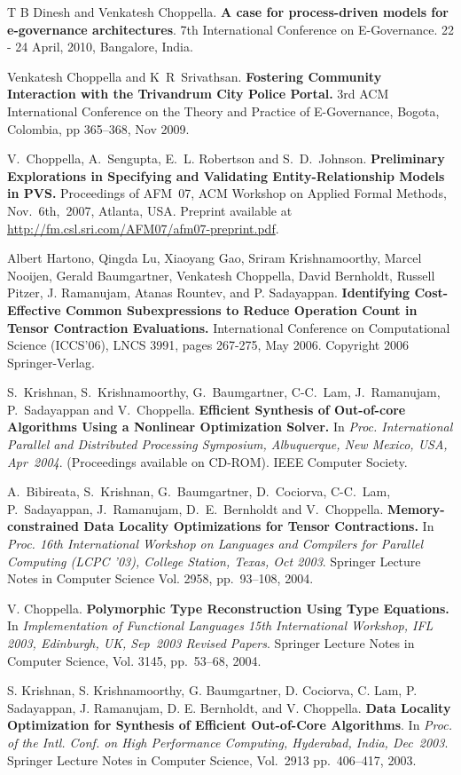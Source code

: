 \documentclass[11pt,margin,line]{res}
\begin{document}
\begin{resume}
T B Dinesh and Venkatesh Choppella.  {\bf A case for
  process-driven models for e-governance architectures}.
7th International Conference on E-Governance.  22 - 24
April, 2010, Bangalore, India.

Venkatesh Choppella and K~R~Srivathsan.  {\bf Fostering
  Community Interaction with the Trivandrum City Police
  Portal.}  3rd ACM International Conference on the Theory
and Practice of E-Governance, Bogota, Colombia, pp 365--368,
Nov 2009.

V.~Choppella, A.~Sengupta, E.~L. Robertson and
S.~D.~Johnson.  {\bf Preliminary Explorations in Specifying
  and Validating Entity-Relationship Models in PVS.}
Proceedings of AFM~07, ACM Workshop on Applied Formal
Methods, Nov.~6th,~2007, Atlanta, USA.  Preprint available
at \url{http://fm.csl.sri.com/AFM07/afm07-preprint.pdf}.

Albert Hartono, Qingda Lu, Xiaoyang Gao, Sriram
Krishnamoorthy, Marcel Nooijen, Gerald Baumgartner,
Venkatesh Choppella, David Bernholdt, Russell Pitzer,
J. Ramanujam, Atanas Rountev, and P. Sadayappan.  {\bf
Identifying Cost-Effective Common Subexpressions to Reduce
Operation Count in Tensor Contraction Evaluations.}
International Conference on Computational Science (ICCS'06),
LNCS 3991, pages 267-275, May 2006.  Copyright 2006
Springer-Verlag.

S.~Krishnan, S.~Krishnamoorthy, G.~Baumgartner, C-C.~Lam,
J.~Ramanujam, P.~Sadayappan and V.~Choppella.  {\bf
Efficient Synthesis of Out-of-core Algorithms Using a
Nonlinear Optimization Solver.}  In {\em
{Proc. International Parallel and Distributed Processing
Symposium, Albuquerque, New Mexico, USA, Apr~2004}}.
(Proceedings available on CD-ROM).  IEEE Computer Society.

A.~Bibireata, S.~Krishnan, G.~Baumgartner, D.~Cociorva,
C-C.~Lam, P.~Sadayappan, J.~Ramanujam, D.~E.~Bernholdt and
V.~Choppella.  {\bf Memory-constrained Data Locality
Optimizations for Tensor Contractions.}  In {\em {Proc. 16th
International Workshop on Languages and Compilers for
Parallel Computing (LCPC '03), College Station, Texas, Oct
2003}}.  Springer Lecture Notes in Computer Science
Vol. 2958, pp.~93--108, 2004.

V. Choppella.  {\bf Polymorphic Type Reconstruction Using
Type Equations.}  In {\em {Implementation of Functional
Languages 15th International Workshop, IFL 2003, Edinburgh,
UK, Sep~2003 Revised Papers}}.  Springer Lecture Notes in
Computer Science, Vol. 3145, pp.~53--68, 2004.

S. Krishnan, S. Krishnamoorthy, G. Baumgartner, D. Cociorva,
C. Lam, P.  Sadayappan, J. Ramanujam, D. E. Bernholdt, and
V. Choppella.  {\bf Data Locality Optimization for Synthesis
of Efficient Out-of-Core Algorithms}. In {\em {Proc. of the
Intl. Conf. on High Performance Computing, Hyderabad, India,
Dec~2003}}.  Springer Lecture Notes in Computer Science,
Vol.~2913 pp.~406--417, 2003.


\end{resume}
\end{document}
